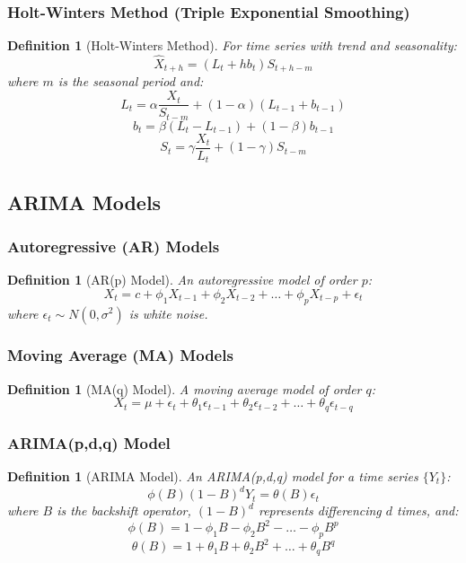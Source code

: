 \documentclass[11pt,a4paper]{article}
\newtheorem{definition}[theorem]{Definition}
\begin{document}
\subsubsection{Holt-Winters Method (Triple Exponential Smoothing)}

\begin{definition}[Holt-Winters Method]
For time series with trend and seasonality:
$$\hat{X}_{t+h} = (L_t + hb_t)S_{t+h-m}$$
where $m$ is the seasonal period and:
$$L_t = \alpha \frac{X_t}{S_{t-m}} + (1-\alpha)(L_{t-1} + b_{t-1})$$
$$b_t = \beta(L_t - L_{t-1}) + (1-\beta)b_{t-1}$$
$$S_t = \gamma \frac{X_t}{L_t} + (1-\gamma)S_{t-m}$$
\end{definition}

\subsection{ARIMA Models}

\subsubsection{Autoregressive (AR) Models}

\begin{definition}[AR(p) Model]
An autoregressive model of order $p$:
$$X_t = c + \phi_1 X_{t-1} + \phi_2 X_{t-2} + \ldots + \phi_p X_{t-p} + \epsilon_t$$
where $\epsilon_t \sim N(0, \sigma^2)$ is white noise.
\end{definition}

\subsubsection{Moving Average (MA) Models}

\begin{definition}[MA(q) Model]
A moving average model of order $q$:
$$X_t = \mu + \epsilon_t + \theta_1 \epsilon_{t-1} + \theta_2 \epsilon_{t-2} + \ldots + \theta_q \epsilon_{t-q}$$
\end{definition}

\subsubsection{ARIMA(p,d,q) Model}

\begin{definition}[ARIMA Model]
An ARIMA(p,d,q) model for a time series $\{Y_t\}$:
$$\phi(B)(1-B)^d Y_t = \theta(B)\epsilon_t$$
where $B$ is the backshift operator, $(1-B)^d$ represents differencing $d$ times, and:
$$\phi(B) = 1 - \phi_1 B - \phi_2 B^2 - \ldots - \phi_p B^p$$
$$\theta(B) = 1 + \theta_1 B + \theta_2 B^2 + \ldots + \theta_q B^q$$
\end{definition}
\end{document}
